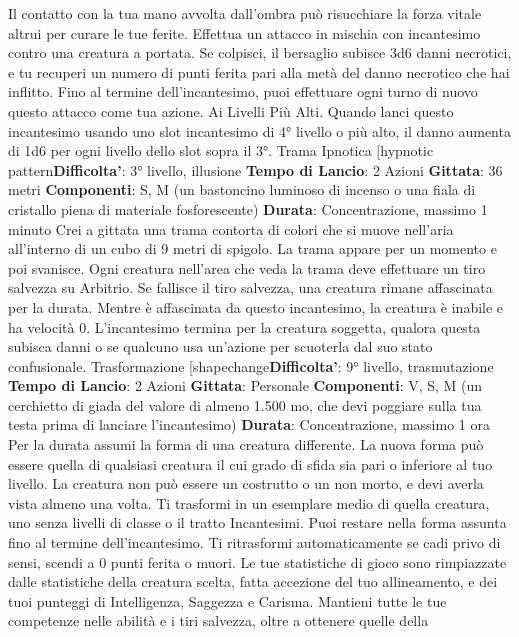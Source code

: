 \begin{multicols}{2}
Il contatto con la tua mano avvolta dall’ombra può
risucchiare la forza vitale altrui per curare le tue ferite.
Effettua un attacco in mischia con incantesimo contro
una creatura a portata. Se colpisci, il bersaglio subisce
3d6 danni necrotici, e tu recuperi un numero di punti
ferita pari alla metà del danno necrotico che hai inflitto.
Fino al termine dell’incantesimo, puoi effettuare ogni
turno di nuovo questo attacco come tua azione.
Ai Livelli Più Alti. Quando lanci questo incantesimo
usando uno slot incantesimo di 4° livello o più alto, il
danno aumenta di 1d6 per ogni livello dello slot sopra il
3°.
Trama Ipnotica
[hypnotic pattern\textbf{Difficolta'}:
3° livello, illusione
\textbf{Tempo di Lancio}: 2 Azioni
\textbf{Gittata}: 36 metri
\textbf{Componenti}: S, M (un bastoncino luminoso di incenso
o una fiala di cristallo piena di materiale fosforescente)
\textbf{Durata}: Concentrazione, massimo 1 minuto
Crei a gittata una trama contorta di colori che si muove
nell’aria all’interno di un cubo di 9 metri di spigolo. La
trama appare per un momento e poi svanisce. Ogni
creatura nell’area che veda la trama deve effettuare un
tiro salvezza su Arbitrio. Se fallisce il tiro salvezza,
una creatura rimane affascinata per la durata. Mentre è
affascinata da questo incantesimo, la creatura è inabile
e ha velocità 0.
L’incantesimo termina per la creatura soggetta, qualora
questa subisca danni o se qualcuno usa un’azione per
scuoterla dal suo stato confusionale.
Trasformazione
[shapechange\textbf{Difficolta'}:
9° livello, trasmutazione
\textbf{Tempo di Lancio}: 2 Azioni
\textbf{Gittata}: Personale
\textbf{Componenti}: V, S, M (un cerchietto di giada del valore
di almeno 1.500 mo, che devi poggiare sulla tua testa
prima di lanciare l’incantesimo)
\textbf{Durata}: Concentrazione, massimo 1 ora
Per la durata assumi la forma di una creatura differente.
La nuova forma può essere quella di qualsiasi creatura
il cui grado di sfida sia pari o inferiore al tuo livello. La 
creatura non può essere un costrutto o un non morto, e
devi averla vista almeno una volta. Ti trasformi in un
esemplare medio di quella creatura, uno senza livelli di
classe o il tratto Incantesimi.
Puoi restare nella forma assunta fino al termine
dell’incantesimo. Ti ritrasformi automaticamente se cadi
privo di sensi, scendi a 0 punti ferita o muori.
Le tue statistiche di gioco sono rimpiazzate dalle
statistiche della creatura scelta, fatta accezione del tuo
allineamento, e dei tuoi punteggi di Intelligenza,
Saggezza e Carisma. Mantieni tutte le tue competenze
nelle abilità e i tiri salvezza, oltre a ottenere quelle della

\end{multicols}
